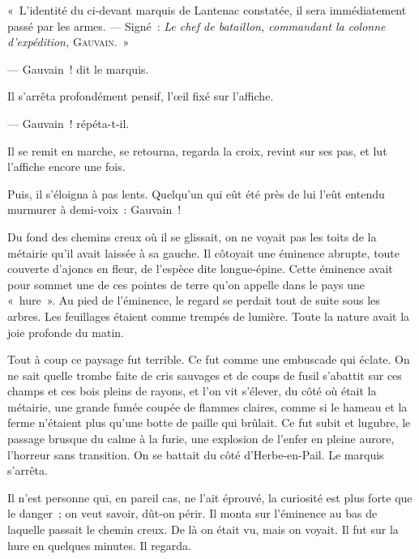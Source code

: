 \documentclass[french,twoside]{book} %
\begin{document}
« L’identité du ci-devant marquis de Lantenac constatée, il sera immédiatement passé par les armes. — Signé : \emph{Le chef de bataillon, commandant la colonne d’expédition,} G{\scshape auvain}. »\par
— Gauvain ! dit le marquis.\par
Il s’arrêta profondément pensif, l’œil fixé sur l’affiche.\par
— Gauvain ! répéta-t-il.\par
Il se remit en marche, se retourna, regarda la croix, revint sur ses pas, et lut l’affiche encore une fois.\par
Puis, il s’éloigna à pas lents. Quelqu’un qui eût été près de lui l’eût entendu murmurer à demi-voix : Gauvain !\par
Du fond des chemins creux où il se glissait, on ne  voyait pas les toits de la métairie qu’il avait laissée à sa gauche. Il côtoyait une éminence abrupte, toute couverte d’ajoncs en fleur, de l’espèce dite longue-épine. Cette éminence avait pour sommet une de ces pointes de terre qu’on appelle dans le pays une « hure ». Au pied de l’éminence, le regard se perdait tout de suite sous les arbres. Les feuillages étaient comme trempés de lumière. Toute la nature avait la joie profonde du matin.\par
Tout à coup ce paysage fut terrible. Ce fut comme une embuscade qui éclate. On ne sait quelle trombe faite de cris sauvages et de coups de fusil s’abattit sur ces champs et ces bois pleins de rayons, et l’on vit s’élever, du côté où était la métairie, une grande fumée coupée de flammes claires, comme si le hameau et la ferme n’étaient plus qu’une botte de paille qui brûlait. Ce fut subit et lugubre, le passage brusque du calme à la furie, une explosion de l’enfer en pleine aurore, l’horreur sans transition. On se battait du côté d’Herbe-en-Pail. Le marquis s’arrêta.\par
Il n’est personne qui, en pareil cas, ne l’ait éprouvé, la curiosité est plus forte que le danger ; on veut savoir, dût-on périr. Il monta sur l’éminence au bas de laquelle passait le chemin creux. De là on était vu, mais on voyait. Il fut sur la hure en quelques minutes. Il regarda.\par
\end{document}
